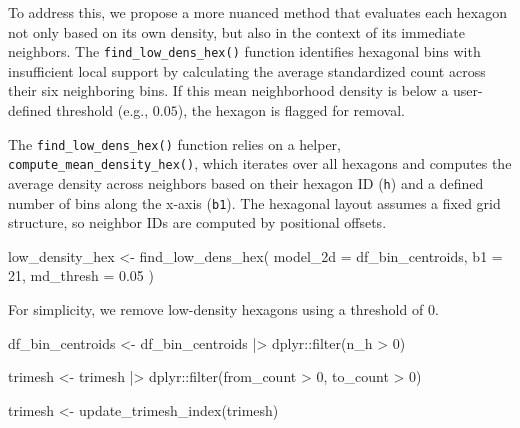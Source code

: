 \documentclass[
  11pt,
  a4paper,
]{report}
\newenvironment{Shaded}{\begin{snugshade}}{\end{snugshade}}
\newcommand{\AttributeTok}[1]{\textcolor[rgb]{0.40,0.45,0.13}{#1}}
\newcommand{\DecValTok}[1]{\textcolor[rgb]{0.68,0.00,0.00}{#1}}
\newcommand{\FloatTok}[1]{\textcolor[rgb]{0.68,0.00,0.00}{#1}}
\newcommand{\FunctionTok}[1]{\textcolor[rgb]{0.28,0.35,0.67}{#1}}
\newcommand{\NormalTok}[1]{\textcolor[rgb]{0.00,0.23,0.31}{#1}}
\newcommand{\OtherTok}[1]{\textcolor[rgb]{0.00,0.23,0.31}{#1}}
\newcommand{\SpecialCharTok}[1]{\textcolor[rgb]{0.37,0.37,0.37}{#1}}
\begin{document}
To address this, we propose a more nuanced method that evaluates each
hexagon not only based on its own density, but also in the context of
its immediate neighbors. The \texttt{find\_low\_dens\_hex()} function
identifies hexagonal bins with insufficient local support by calculating
the average standardized count across their six neighboring bins. If
this mean neighborhood density is below a user-defined threshold (e.g.,
\(0.05\)), the hexagon is flagged for removal.

The \texttt{find\_low\_dens\_hex()} function relies on a helper,
\texttt{compute\_mean\_density\_hex()}, which iterates over all hexagons
and computes the average density across neighbors based on their hexagon
ID (\texttt{h}) and a defined number of bins along the x-axis
(\texttt{b1}). The hexagonal layout assumes a fixed grid structure, so
neighbor IDs are computed by positional offsets.

\begin{Shaded}
\begin{Highlighting}[]
\NormalTok{low\_density\_hex }\OtherTok{\textless{}{-}} \FunctionTok{find\_low\_dens\_hex}\NormalTok{(}
  \AttributeTok{model\_2d =}\NormalTok{ df\_bin\_centroids, }
  \AttributeTok{b1 =} \DecValTok{21}\NormalTok{, }
  \AttributeTok{md\_thresh =} \FloatTok{0.05}
\NormalTok{)}
\end{Highlighting}
\end{Shaded}

For simplicity, we remove low-density hexagons using a threshold of
\(0\).

\begin{Shaded}
\begin{Highlighting}[]
\NormalTok{df\_bin\_centroids }\OtherTok{\textless{}{-}}\NormalTok{ df\_bin\_centroids }\SpecialCharTok{|\textgreater{}}
\NormalTok{  dplyr}\SpecialCharTok{::}\FunctionTok{filter}\NormalTok{(n\_h }\SpecialCharTok{\textgreater{}} \DecValTok{0}\NormalTok{)}

\NormalTok{trimesh }\OtherTok{\textless{}{-}}\NormalTok{ trimesh }\SpecialCharTok{|\textgreater{}}
\NormalTok{  dplyr}\SpecialCharTok{::}\FunctionTok{filter}\NormalTok{(from\_count }\SpecialCharTok{\textgreater{}} \DecValTok{0}\NormalTok{,}
\NormalTok{                to\_count }\SpecialCharTok{\textgreater{}} \DecValTok{0}\NormalTok{)}

\NormalTok{trimesh }\OtherTok{\textless{}{-}} \FunctionTok{update\_trimesh\_index}\NormalTok{(trimesh)}
\end{Highlighting}
\end{Shaded}
\end{document}
